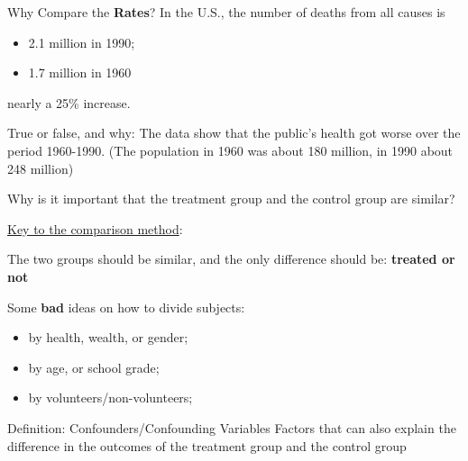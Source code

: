 \documentclass[
  ignorenonframetext, 10pt
]{beamer}
\providecommand{\tightlist}{%
  \setlength{\itemsep}{0pt}\setlength{\parskip}{0pt}}
\begin{document}
\begin{frame}{Why Compare the \textbf{Rates}?}
\protect\hypertarget{why-compare-the}{}
In the U.S., the number of deaths from all causes is

\begin{itemize}
\tightlist
\item
  2.1 million in 1990;
\item
  1.7 million in 1960
\end{itemize}

nearly a 25\% increase.

\begin{block}{True or false, and why:}
The data show that the public's health got worse over
the period 1960-1990. (The population in 1960 was about 180 million,
in 1990 about 248 million)
\end{block}
\pause
{}
\end{frame}

\begin{frame}{}
\protect\hypertarget{section-2}{}
Why is it important that the treatment group and the control group are
similar? \bigskip\pause

\underline{Key to the comparison method}:

The two groups should be similar, and the only difference should be:
\textbf{treated or not} \bigskip\pause

Some \textbf{bad} ideas on how to divide subjects:

\begin{itemize}
\tightlist
\item
  by health, wealth, or gender;
\item
  by age, or school grade;
\item
  by volunteers/non-volunteers;
\end{itemize}

\bigskip

\pause

\begin{block}{Definition: Confounders/Confounding Variables}
Factors that can also explain the difference in the outcomes
of the treatment group and the control group
\end{block}
\end{frame}
\end{document}
